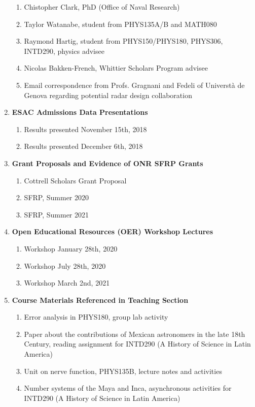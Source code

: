 \documentclass[../../main.tex]{subfiles}
\begin{document}
\begin{enumerate}
\begin{enumerate}
\item Chistopher Clark, PhD (Office of Naval Research)
\item Taylor Watanabe, student from PHYS135A/B and MATH080
\item Raymond Hartig, student from PHYS150/PHYS180, PHYS306, INTD290, physics advisee
\item Nicolas Bakken-French, Whittier Scholars Program advisee
\item Email correspondence from Profs. Gragnani and Fedeli of Universt\`{a} de Genova regarding potential radar design collaboration
\end{enumerate}
\item \textbf{ESAC Admissions Data Presentations}
\begin{enumerate}
\item Results presented November 15th, 2018
\item Results presented December 6th, 2018
\end{enumerate}
\item \textbf{Grant Proposals and Evidence of ONR SFRP Grants}
\begin{enumerate}
\item Cottrell Scholars Grant Proposal
\item SFRP, Summer 2020
\item SFRP, Summer 2021
\end{enumerate}
\item \textbf{Open Educational Resources (OER) Workshop Lectures}
\begin{enumerate}
\item Workshop January 28th, 2020
\item Workshop July 28th, 2020
\item Workshop March 2nd, 2021
\end{enumerate}
\item \textbf{Course Materials Referenced in Teaching Section}
\begin{enumerate}
\item Error analysis in PHYS180, group lab activity
\item Paper about the contributions of Mexican astronomers in the late 18th Century, reading assignment for INTD290 (A History of Science in Latin America)
\item Unit on nerve function, PHYS135B, lecture notes and activities
\item Number systems of the Maya and Inca, asynchronous activities for INTD290 (A History of Science in Latin America)

\end{enumerate}
\end{enumerate}
\end{document}
